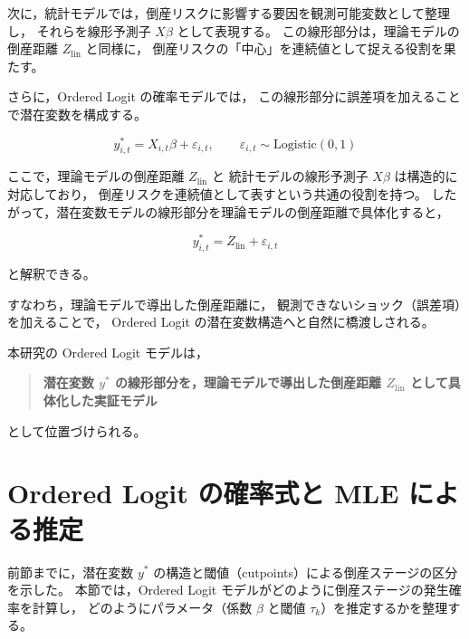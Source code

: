 次に，統計モデルでは，倒産リスクに影響する要因を観測可能変数として整理し，
それらを線形予測子 $X\beta$ として表現する。
この線形部分は，理論モデルの倒産距離 $Z_{\text{lin}}$ と同様に，
倒産リスクの「中心」を連続値として捉える役割を果たす。

さらに，Ordered Logit の確率モデルでは，
この線形部分に誤差項を加えることで潜在変数を構成する。



\[
y^*_{i,t} = X_{i,t}\beta + \varepsilon_{i,t},
\qquad
\varepsilon_{i,t} \sim \text{Logistic}(0,1)
\]



ここで，理論モデルの倒産距離 $Z_{\text{lin}}$ と
統計モデルの線形予測子 $X\beta$ は構造的に対応しており，
倒産リスクを連続値として表すという共通の役割を持つ。
したがって，潜在変数モデルの線形部分を理論モデルの倒産距離で具体化すると，



\[
y^*_{i,t} = Z_{\text{lin}} + \varepsilon_{i,t}
\]



と解釈できる。

すなわち，理論モデルで導出した倒産距離に，
観測できないショック（誤差項）を加えることで，
Ordered Logit の潜在変数構造へと自然に橋渡しされる。

本研究の Ordered Logit モデルは，

\begin{quote}
\textbf{潜在変数 $y^*$ の線形部分を，理論モデルで導出した倒産距離 $Z_{\text{lin}}$ として具体化した実証モデル}
\end{quote}

として位置づけられる。



\section{Ordered Logit の確率式と MLE による推定}
\label{sec:ordered_logit_mle}

前節までに，潜在変数 $y^*$ の構造と閾値（cutpoints）による倒産ステージの区分を示した。
本節では，Ordered Logit モデルがどのように倒産ステージの発生確率を計算し，
どのようにパラメータ（係数 $\beta$ と閾値 $\tau_k$）を推定するかを整理する。


